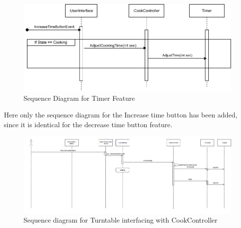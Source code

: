 \begin{figure}[h]
  \centering
  \includegraphics[scale=0.8]{02-Body/Image/TimerFeatureSEQ.pdf}
  \caption{Sequence Diagram for Timer Feature}%
  \label{fig:timeFeature}
\end{figure}

Here only the sequence diagram for the Increase time button has been added, since it
is identical for the decrease time button feature.

\begin{figure}[h]
  \centering
  \includegraphics[scale=0.6]{02-Body/Image/TurntableSeq.PNG}
  \caption{Sequence diagram for Turntable interfacing with CookController}%
  \label{fig:TurntableSeq}
\end{figure}

\newpage
